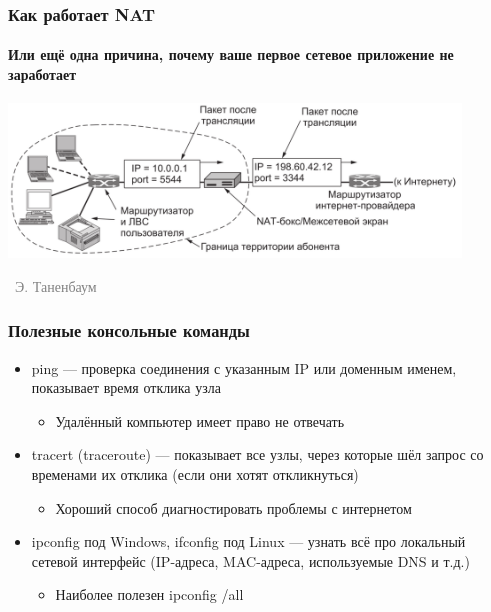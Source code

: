 \documentclass[xetex,mathserif,serif]{beamer}
\newcommand{\attribution}[1] {
\vspace{-5mm}\begin{flushright}\begin{scriptsize}\textcolor{gray}{\textcopyright\, #1}\end{scriptsize}\end{flushright}
}
\begin{document}
	\begin{frame}
		\frametitle{Как работает NAT}
		\framesubtitle{Или ещё одна причина, почему ваше первое сетевое приложение не заработает}
		\begin{center}
			\includegraphics[width=0.9\textwidth]{nat.png}
			\attribution{Э. Таненбаум}
		\end{center}
	\end{frame}

	\begin{frame}
		\frametitle{Полезные консольные команды}
		\begin{itemize}
			\item ping --- проверка соединения с указанным IP или доменным именем, показывает время отклика узла
			\begin{itemize}
				\item Удалённый компьютер имеет право не отвечать
			\end{itemize}
			\item tracert (traceroute) --- показывает все узлы, через которые шёл запрос со временами их отклика (если они хотят откликнуться)
			\begin{itemize}
				\item Хороший способ диагностировать проблемы с интернетом
			\end{itemize}
			\item ipconfig под Windows, ifconfig под Linux --- узнать всё про локальный сетевой интерфейс (IP-адреса, MAC-адреса, используемые DNS и т.д.)
			\begin{itemize}
				\item Наиболее полезен ipconfig /all
			\end{itemize}
		\end{itemize}
	\end{frame}
\end{document}
